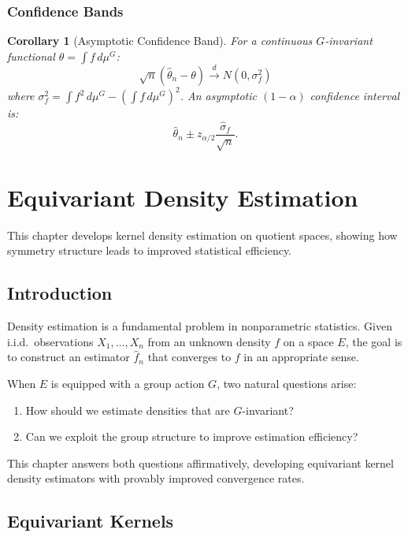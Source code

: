 \documentclass[11pt,twoside,openright]{book}
\theoremstyle{plain}
\newtheorem{corollary}[theorem]{Corollary}
\theoremstyle{definition}
\theoremstyle{remark}
\begin{document}
\subsection{Confidence Bands}

\begin{corollary}[Asymptotic Confidence Band]
For a continuous $G$-invariant functional $\theta = \int f \, d\mu^G$:
\[
\sqrt{n}(\hat{\theta}_n - \theta) \xrightarrow{d} N(0, \sigma_f^2)
\]
where $\sigma_f^2 = \int f^2 \, d\mu^G - (\int f \, d\mu^G)^2$. An asymptotic $(1-\alpha)$ confidence interval is:
\[
\hat{\theta}_n \pm z_{\alpha/2} \frac{\hat{\sigma}_f}{\sqrt{n}}.
\]
\end{corollary}


\chapter{Equivariant Density Estimation}
\label{ch:density}

This chapter develops kernel density estimation on quotient spaces, showing how symmetry structure leads to improved statistical efficiency.

\section{Introduction}

Density estimation is a fundamental problem in nonparametric statistics. Given i.i.d.\ observations $X_1, \ldots, X_n$ from an unknown density $f$ on a space $E$, the goal is to construct an estimator $\hat{f}_n$ that converges to $f$ in an appropriate sense.

When $E$ is equipped with a group action $G$, two natural questions arise:
\begin{enumerate}
\item How should we estimate densities that are $G$-invariant?
\item Can we exploit the group structure to improve estimation efficiency?
\end{enumerate}

This chapter answers both questions affirmatively, developing equivariant kernel density estimators with provably improved convergence rates.

\section{Equivariant Kernels}
\end{document}
